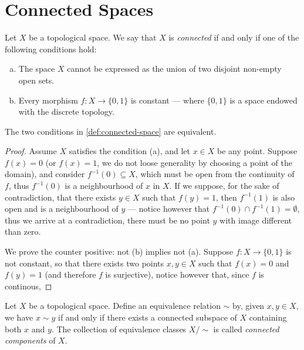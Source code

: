 \section{Connected Spaces}

\begin{definition}
\label{def:connected-space}
Let \(X\) be a topological space. We say that \(X\) is \emph{connected} if and
only if one of the following conditions hold:
\begin{enumerate}[(a)]\setlength\itemsep{0em}
\item The space \(X\) cannot be expressed as the union of two disjoint non-empty
  open sets.
\item Every morphism \(f: X \to \{0, 1\}\) is constant --- where \(\{0, 1\}\) is a
  space endowed with the discrete topology.
\end{enumerate}
\end{definition}

\begin{corollary}
The two conditions in \cref{def:connected-space} are equivalent.
\end{corollary}

\begin{proof}
Assume \(X\) satisfies the condition (a), and let \(x \in X\) be any
point. Suppose \(f(x) = 0\) (or \(f(x) = 1\), we do not loose generality by
choosing a point of the domain), and consider \(f^{-1}(0) \subseteq X\), which
must be open from the continuity of \(f\), thus \(f^{-1}(0)\) is a neighbourhood
of \(x\) in \(X\). If we suppose, for the sake of contradiction, that there
exists \(y \in X\) such that \(f(y) = 1\), then \(f^{-1}(1)\) is also open and
is a neighbourhood of \(y\) --- notice however that \(f^{-1}(0) \cap f^{-1}(1) =
\emptyset\), thus we arrive at a contradiction, there must be no point \(y\)
with image different than zero.

We prove the counter positive: not (b) implies not (a). Suppose \(f: X
\to \{0, 1\}\) is not constant, so that there exists two points \(x, y \in X\)
such that \(f(x) = 0\) and \(f(y) = 1\) (and therefore \(f\) is surjective),
notice however that, since \(f\) is continous,
\end{proof}

\begin{definition}
\label{def:connected-components}
Let \(X\) be a topological space. Define an equivalence relation \(\sim\) by,
given \(x, y \in X\), we have \(x \sim y\) if and only if there exists a
connected subspace of \(X\) containing both \(x\) and \(y\). The collection of
equivalence classes \(X/{\sim}\) is called \emph{connected components} of \(X\).
\end{definition}

